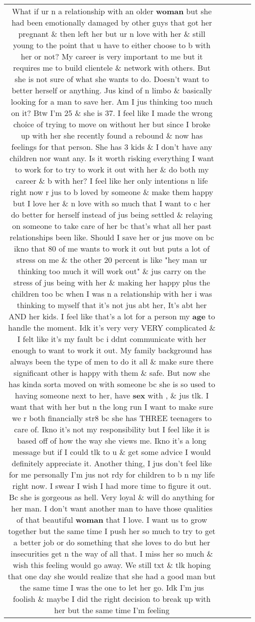 \documentclass[11pt]{article}
\newlength\mylength
\begin{document}
\begin{center}
\begin{longtable}{|C{.65\mylength}|C{.30\mylength}|C{.12\mylength}|C{.12\mylength}|C{.12\mylength}|}
  \small What if ur n a relationship with an older \textbf{woman} but she had been emotionally damaged by other guys that got her pregnant \& then left her but ur n love with her \& still young to the point that u have to either choose to b with her or not? My career is very important to me but it requires me to build clientele \& network with others. But she is not sure of what she wants to do. Doesn't want to better herself or anything. Jus kind of n limbo \& basically looking for a man to save her. Am I jus thinking too much on it? Btw I'm 25 \& she is 37. I feel like I made the wrong choice of trying to move on without her but since I broke up with her she recently found a rebound \& now has feelings for that person. She has 3 kids \& I don't have any children nor want any. Is it worth risking everything I want to work for to try to work it out with her \& do both my career \& b with her? I feel like her only intentions n life right now r jus to b loved by someone \& make them happy but I love her \& n love with so much that I want to c her do better for herself instead of jus being settled \& relaying on someone to take care of her bc that's what all her past relationships been like. Should I save her or jus move on bc ikno that 80 of me wants to work it out but puts a lot of stress on me \& the other 20 percent is like "hey man ur thinking too much it will work out" \& jus carry on the stress of jus being with her \& making her happy plus the children too bc when I was n a relationship with her i was thinking to myself that it's not jus abt her, It's abt her AND her kids. I feel like that's a lot for a person my \textbf{age} to handle \@ the moment. Idk it's very very VERY complicated \& I felt like it's my fault bc i ddnt communicate with her enough to want to work it out. My family background has always been the type of men to do it all \& make sure there significant other is happy with them \& safe. But now she has kinda sorta moved on with someone bc she is so used to having someone next to her, have \textbf{sex} with , \& jus tlk. I want that with her but n the long run I want to make sure we r both financially str8 bc she has THREE teenagers to care of. Ikno it's not my responsibility but I feel like it is based off of how the way she views me. Ikno it's a long message but if I could tlk to u \& get some advice I would definitely appreciate it. Another thing, I jus don't feel like for me personally I'm jus not rdy for children to b n my life right now. I swear I wish I had more time to figure it out. Bc she is gorgeous as hell. Very loyal \& will do anything for her man. I don't want another man to have those qualities of that beautiful \textbf{woman} that I love. I want us to grow together but \@ the same time I push her so much to try to get a better job or do something that she loves to do but her insecurities get n the way of all that. I miss her so much \& wish this feeling would go away. We still txt \& tlk hoping that one day she would realize that she had a good man but \@ the same time I was the one to let her go. Idk I'm jus foolish \& maybe I did the right decision to break up with her but \@ the same time I'm feeling 
\end{longtable}
\end{center}
\end{document}
